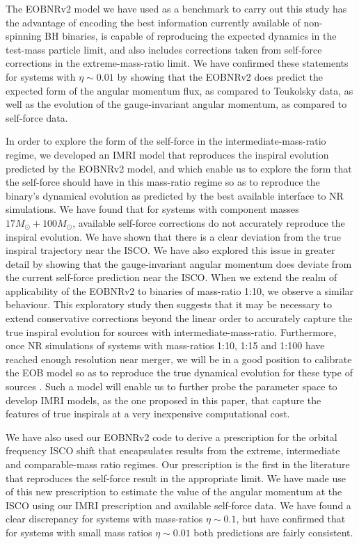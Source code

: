  The EOBNRv2 model we have used as a benchmark to carry out this study has the advantage of encoding the best information currently available of non-spinning BH binaries, is capable of reproducing the expected dynamics in the test-mass particle limit, and also includes corrections taken from self-force corrections in the extreme-mass-ratio limit. We have confirmed these statements for systems with  \(\eta\sim 0.01\) by showing  that the EOBNRv2 does predict the expected form of the angular momentum flux, as compared to Teukolsky data, as well as the evolution  of the gauge-invariant angular momentum, as compared to self-force data. 
 
In order to explore the form of the self-force in the intermediate-mass-ratio regime, we developed an IMRI model that reproduces the inspiral evolution predicted by the EOBNRv2 model, and which enable us to explore the form that the self-force should have in this mass-ratio regime so as to reproduce the binary's dynamical evolution as predicted by the best available interface to NR simulations. We have found that for systems with component masses  \(17M_{\odot} + 100M_{\odot}\), available self-force corrections do not accurately reproduce the inspiral evolution. We have shown that there is a clear deviation from the true inspiral trajectory near the ISCO. We have also explored this issue in greater detail by showing that the gauge-invariant angular momentum does deviate from the current self-force prediction near the ISCO. When we extend the realm of applicability of the EOBNRv2 to binaries of mass-ratio 1:10, we observe a similar behaviour.  This exploratory study then suggests that it may be necessary to 
extend conservative corrections beyond the linear order to accurately capture the true inspiral evolution for sources with intermediate-mass-ratio. Furthermore, once NR simulations of systems with mass-ratios 1:10, 1:15 and 1:100 have reached enough resolution near merger, we will be in a good position to calibrate the EOB model so as to reproduce the true dynamical evolution for these type of sources \cite{carlos, carlosI,carlosII}. Such a model will enable us to further probe the parameter space to develop IMRI models, as the one proposed in this paper, that capture the features of true inspirals at a very inexpensive computational cost. 

We have also used our EOBNRv2 code to derive a prescription for the orbital frequency ISCO shift that encapsulates results from the extreme, intermediate and comparable-mass ratio regimes. Our prescription is the first in the literature that reproduces the self-force result in the appropriate limit.   We have made use of this new prescription to estimate the value of the angular momentum at the ISCO using our IMRI prescription and available self-force data. We have found a clear discrepancy for systems with mass-ratios \(\eta \sim 0.1\), but have confirmed that for systems with small mass ratios \(\eta\sim 0.01\) both predictions are fairly consistent. 

